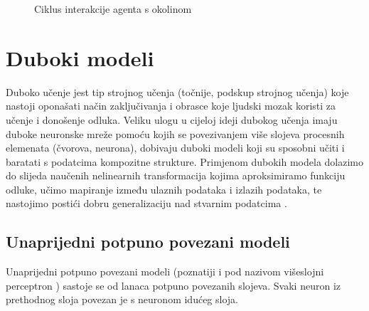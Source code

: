 \begin{figure}[H]
    \centering
    \caption{Ciklus interakcije agenta s okolinom \cite{wikiRL}}
    \label{fig:rl}
\end{figure}

\section{Duboki modeli}

Duboko učenje  jest tip strojnog učenja (točnije, podskup strojnog učenja) koje nastoji oponašati način zaključivanja i obrasce koje ljudski mozak koristi za učenje i donošenje odluka. Veliku ulogu u cijeloj ideji dubokog učenja imaju duboke neuronske mreže  pomoću kojih se povezivanjem više slojeva procesnih elemenata (čvorova, neurona), dobivaju duboki modeli koji su sposobni učiti i baratati s podatcima kompozitne strukture. Primjenom dubokih modela dolazimo do slijeda naučenih nelinearnih transformacija kojima aproksimiramo funkciju odluke, učimo mapiranje između ulaznih podataka i izlazih podataka, te nastojimo postići dobru generalizaciju nad stvarnim podatcima \cite{DLBook}. 

\subsection{Unaprijedni potpuno povezani modeli}

Unaprijedni potpuno povezani modeli  (poznatiji i pod nazivom višeslojni perceptron ) sastoje se od lanaca potpuno povezanih slojeva. Svaki neuron iz prethodnog sloja povezan je s neuronom idućeg sloja. 


